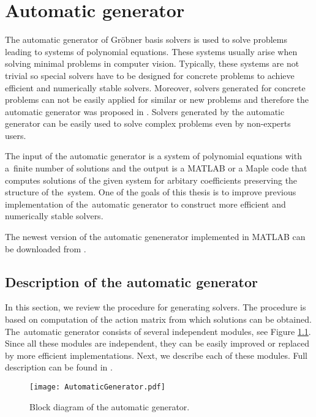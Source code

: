 \chapter{Automatic generator}
The automatic generator of Gr\"obner basis solvers is used to solve problems leading to systems of polynomial equations. These systems usually arise when solving minimal problems \cite{MinimalProblems} in computer vision. Typically, these systems are not trivial so special solvers have to be designed for concrete problems to achieve efficient and numerically stable solvers. Moreover, solvers generated for concrete problems can not be easily applied for similar or new problems and therefore the automatic generator was proposed in \cite{AutoGen}. Solvers generated by the automatic generator can be easily used to solve complex problems even by non-experts users.

The input of the automatic generator is a system of polynomial equations with a~finite number of solutions and the output is a MATLAB or a Maple code that computes solutions of the given system for arbitary coefficients preserving the structure of the~system. One of the goals of this thesis is to improve previous implementation \cite{AutoGen} of the~automatic generator to construct more efficient and numerically stable solvers.

The newest version of the automatic genenerator implemented in MATLAB can be downloaded from \cite{AutomaticGenerator}.

\section{Description of the automatic generator}
In this section, we review the procedure for generating solvers. The procedure is based on computation of the action matrix from which solutions can be obtained. The~automatic generator consists of several independent modules, see Figure \ref{autogen:blockDiagram}. Since all these modules are independent, they can be easily improved or replaced by more efficient implementations. Next, we describe each of these modules. Full description can be found in \cite{AutoGen, KukelovaAlgMethods}.

\begin{figure}[ht]
  \centering
  \texttt{[image: AutomaticGenerator.pdf]}
  \caption{Block diagram of the automatic generator.}
  \label{autogen:blockDiagram}
\end{figure}

